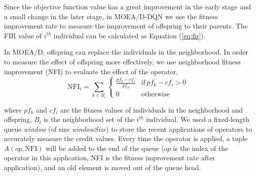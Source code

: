 \documentclass[journal]{IEEEtran}
\newcommand{\TODO}[1]{\textcolor[rgb]{1.00,0.40,0.22}{#1}}
\begin{document}
Since the objective function value has a great improvement in the early stage and a small change in the later stage, in MOEA/D-DQN we use the fitness improvement rate to measure the improvement of offspring to their parents.
The FIR value of $i^{th}$ individual can be calculated as Equation (\ref{eq:fir}).


In MOEA/D, offspring can replace the individuals in the neighborhood. In order to measure the effect of offspring more effectively, we use neighborhood fitness improvement (NFI) to evaluate the effect of the operator,
\begin{equation}
    \text{NFI}_{i}= \sum_{k \in B_i}
    \left\{
    \begin{array}{ll}
        \frac{pf_{k}-cf_{i}}{pf_{k}} & \text{if}\ pf_{k}-cf_{i}>0 \\

        0                            & \text{otherwise}
    \end{array}
    \right.
    \label{eq:nfi}
\end{equation}

where $pf_{k}$ and $cf_{i}$ are the fitness values of individuals in the neighborhood and offspring, $B_i$ is the neighborhood set of the $i^{th}$ individual.
% 
We used a fixed-length queue \textit{window} (of size \textit{windowSize}) to store the recent applications of operators to accurately measure the credit values.
Every time the operator is applied, a tuple $A (op, \text{NFI})$ will be added to the end of the queue ($op$ is the index of the operator in this application, NFI is the fitness improvement rate after application), and an old element is moved out of the queue head.
\end{document}
